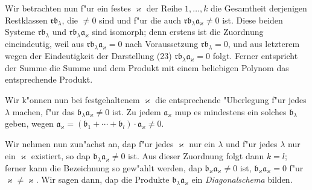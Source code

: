 \documentclass[12pt,a4paper]{article}
\begin{document}
Wir betrachten nun f"ur ein festes $\varkappa$ der Reihe $1,\ldots,k$ die Gesamtheit derjenigen Restklassen $\mathfrak{r}\mathfrak{b}_\lambda$, die $\neq 0$ sind und f"ur die auch $\mathfrak{r}\mathfrak{b}_\lambda\mathfrak{a}_\varkappa \neq 0$ ist. Diese beiden Systeme $\mathfrak{r}\mathfrak{b}_\lambda$ und $\mathfrak{r}\mathfrak{b}_\lambda\mathfrak{a}_\varkappa$ sind isomorph; denn erstens ist die Zuordnung eineindeutig, weil aus $\mathfrak{r}\mathfrak{b}_\lambda\mathfrak{a}_\varkappa = 0$ nach Voraussetzung $\mathfrak{r}\mathfrak{b}_\lambda = 0$, und aus letzterem wegen der Eindeutigkeit der Darstellung (23) $\mathfrak{r}\mathfrak{b}_\lambda\mathfrak{a}_\varkappa = 0$ folgt. Ferner entspricht der Summe die Summe und dem Produkt mit einem beliebigen Polynom das entsprechende Produkt.

Wir k"onnen nun bei festgehaltenem $\varkappa$ die entsprechende "Uberlegung f"ur jedes $\lambda$ machen, f"ur das $\mathfrak{b}_\lambda\mathfrak{a}_\varkappa \neq 0$ ist. Zu jedem $\mathfrak{a}_\varkappa$ mup es mindestens ein solches $\mathfrak{b}_\lambda$ geben, wegen $\mathfrak{a}_\varkappa = (\mathfrak{b}_1 + \cdots + \mathfrak{b}_l) \cdot \mathfrak{a}_\varkappa \neq 0$.

Wir nehmen nun zun"achst an, dap f"ur jedes $\varkappa$ nur ein $\lambda$ und f"ur jedes $\lambda$ nur ein $\varkappa$ existiert, so dap $\mathfrak{b}_\lambda\mathfrak{a}_\varkappa \neq 0$ ist. Aus dieser Zuordnung folgt dann $k=l$; ferner kann die Bezeichnung so gew"ahlt werden, dap $\mathfrak{b}_\varkappa\mathfrak{a}_\varkappa \neq 0$ ist, $\mathfrak{b}_\varkappa\mathfrak{a}_\varkappa = 0$ f"ur $\varkappa \neq \varkappa$. Wir sagen dann, dap die Produkte $\mathfrak{b}_\lambda\mathfrak{a}_\varkappa$ ein \emph{Diagonalschema} bilden.
\end{document}
